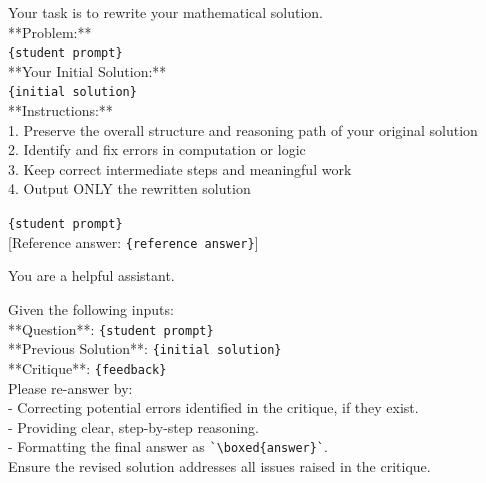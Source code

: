 \begin{prompt}[title={$\mathcal{P}_{\text{TRD}}$ --- user message of the TRD rewrite}]
Your task is to rewrite your mathematical solution.\\[4pt]
**Problem:**\\
\texttt{\{student prompt\}}\\[4pt]
**Your Initial Solution:**\\
\texttt{\{initial solution\}}\\[4pt]
**Instructions:**\\
1. Preserve the overall structure and reasoning path of your original solution\\
2. Identify and fix errors in computation or logic\\
3. Keep correct intermediate steps and meaningful work\\
4. Output ONLY the rewritten solution
\end{prompt}

\begin{prompt}[title={$\mathcal{P}_{\text{OPSD}}$ --- user message of the teacher in OPSD-T}]
\texttt{\{student prompt\}}\\[4pt]
{[}Reference answer: \texttt{\{reference answer\}}{]}
\end{prompt}

\begin{prompt}[title={$\mathcal{P}_{\text{CGRPO}}^{\text{sys}}$ --- system prompt of the refinement in Critique-GRPO}]
You are a helpful assistant.
\end{prompt}

\begin{prompt}[title={$\mathcal{P}_{\text{CGRPO}}$ --- user message of the refinement in Critique-GRPO}]
Given the following inputs:\\
**Question**: \texttt{\{student prompt\}}\\
**Previous Solution**: \texttt{\{initial solution\}}\\
**Critique**: \texttt{\{feedback\}}\\[4pt]
Please re-answer by:\\
- Correcting potential errors identified in the critique, if they exist.\\
- Providing clear, step-by-step reasoning.\\
- Formatting the final answer as \verb|`\boxed{answer}`|.\\[4pt]
Ensure the revised solution addresses all issues raised in the critique.
\end{prompt}

